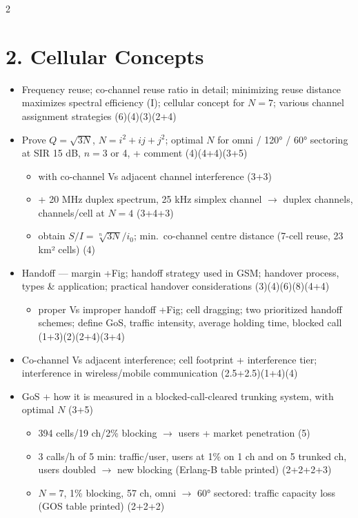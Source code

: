 \documentclass[10pt]{article}
\begin{document}
\begin{multicols}{2}
\section*{2. Cellular Concepts}
\begin{itemize}
  \item Frequency reuse; co-channel reuse ratio in detail; minimizing reuse distance maximizes spectral efficiency (I); cellular concept for $N{=}7$; various channel assignment strategies \hfill (6)(4)(3)(2+4)
  \item Prove $Q{=}\sqrt{3N}$, $N{=}i^2{+}ij{+}j^2$; optimal $N$ for omni / 120° / 60° sectoring at SIR 15 dB, $n{=}3$ or 4, + comment \hfill (4)(4+4)(3+5)
    \begin{itemize}
      \item with co-channel Vs adjacent channel interference \hfill (3+3)
      \item + 20 MHz duplex spectrum, 25 kHz simplex channel $\rightarrow$ duplex channels, channels/cell at $N{=}4$ \hfill (3+4+3)
      \item obtain $S/I{=}\sqrt[n]{3N}/i_0$; min.\ co-channel centre distance (7-cell reuse, 23 km² cells) \hfill (4)
    \end{itemize}
  \item Handoff --- margin +Fig; handoff strategy used in GSM; handover process, types \& application; practical handover considerations \hfill (3)(4)(6)(8)(4+4)
    \begin{itemize}
      \item proper Vs improper handoff +Fig; cell dragging; two prioritized handoff schemes; define GoS, traffic intensity, average holding time, blocked call \hfill (1+3)(2)(2+4)(3+4)
    \end{itemize}
  \item Co-channel Vs adjacent interference; cell footprint + interference tier; interference in wireless/mobile communication \hfill (2.5+2.5)(1+4)(4)
  \item GoS + how it is measured in a blocked-call-cleared trunking system, with optimal $N$ \hfill (3+5)
    \begin{itemize}
      \item 394 cells/19 ch/2\% blocking $\rightarrow$ users + market penetration \hfill (5)
      \item 3 calls/h of 5 min: traffic/user, users at 1\% on 1 ch and on 5 trunked ch, users doubled $\rightarrow$ new blocking (Erlang-B table printed) \hfill (2+2+2+3)
      \item $N{=}7$, 1\% blocking, 57 ch, omni $\rightarrow$ 60° sectored: traffic capacity loss (GOS table printed) \hfill (2+2+2)

\end{itemize}
\end{itemize}
\end{multicols}
\end{document}
